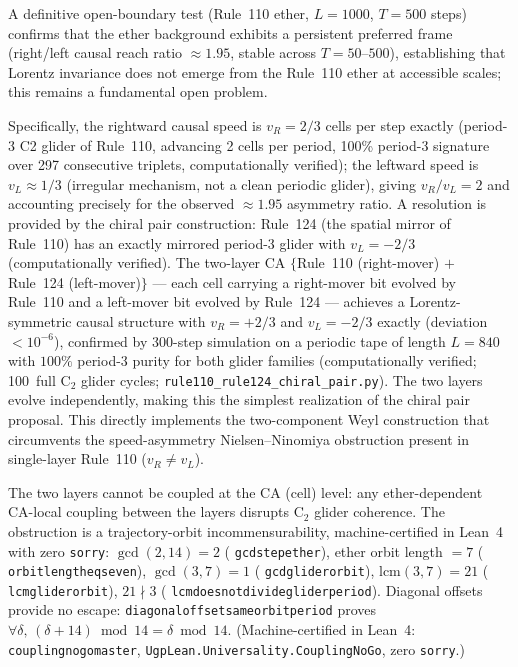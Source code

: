 \documentclass[11pt]{article}
\theoremstyle{remark}
\newcommand{\lean}[1]{%
  \penalty-100
  \begingroup\def\_{\textunderscore\allowbreak}\texttt{#1}\endgroup}
\begin{document}
A definitive open-boundary test (Rule~110 ether, $L=1000$, $T=500$ steps) confirms that
the ether background exhibits a persistent preferred frame (right/left causal reach ratio
$\approx 1.95$, stable across $T=50$--$500$), establishing that Lorentz invariance does
not emerge from the Rule~110 ether at accessible scales; this remains a fundamental open problem.

Specifically, the rightward causal speed is $v_R = 2/3$ cells per step exactly
(period-3 C2 glider of Rule~110, advancing 2 cells per period, 100\% period-3
signature over 297 consecutive triplets, computationally verified); the leftward speed is
$v_L \approx 1/3$ (irregular mechanism, not a clean periodic glider), giving
$v_R/v_L = 2$ and accounting precisely for the observed $\approx 1.95$ asymmetry ratio.
A resolution is provided by the chiral pair construction: Rule~124 (the spatial mirror of Rule~110) has an exactly mirrored period-3 glider with $v_L = -2/3$ (computationally verified). The two-layer CA $\{$Rule~110 (right-mover) $+$ Rule~124 (left-mover)$\}$ --- each cell carrying a right-mover bit evolved by Rule~110 and a left-mover bit evolved by Rule~124 --- achieves a Lorentz-symmetric causal structure with $v_R = +2/3$ and $v_L = -2/3$ exactly (deviation $< 10^{-6}$), confirmed by 300-step simulation on a periodic tape of length $L = 840$ with $100\%$ period-3 purity for both glider families (computationally verified; 100~full C$_2$ glider cycles; \texttt{rule110\_rule124\_chiral\_pair.py}). The two layers evolve independently, making this the simplest realization of the chiral pair proposal. This directly implements the two-component Weyl construction that circumvents the speed-asymmetry Nielsen--Ninomiya obstruction present in single-layer Rule~110 ($v_R \neq v_L$).

The two layers cannot be coupled at the CA (cell) level: any ether-dependent CA-local coupling between the layers disrupts C$_2$ glider coherence. The obstruction is a trajectory-orbit incommensurability, machine-certified in Lean~4 with zero \texttt{sorry}: $\gcd(2,14)=2$ (\lean{gcd\_step\_ether}), ether orbit length $= 7$ (\lean{orbit\_length\_eq\_seven}), $\gcd(3,7)=1$ (\lean{gcd\_glider\_orbit}), $\mathrm{lcm}(3,7)=21$ (\lean{lcm\_glider\_orbit}), $21 \nmid 3$ (\lean{lcm\_does\_not\_divide\_glider\_period}). Diagonal offsets provide no escape: \lean{diagonal\_offset\_same\_orbit\_period} proves $\forall \delta,\, (\delta + 14) \bmod 14 = \delta \bmod 14$. (Machine-certified in Lean~4: \lean{coupling\_no\_go\_master}, \lean{UgpLean.Universality.CouplingNoGo}, zero \texttt{sorry}.)
\end{document}
